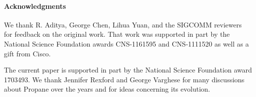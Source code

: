 \documentclass[10pt]{sigalternate052015}
\newcommand{\para}[1]{\paragraph*{\textbf{#1}}}
\begin{document}
\para{Acknowledgments}
We thank R. Aditya, George Chen,  Lihua Yuan, and the SIGCOMM reviewers for feedback on the original
work. That work was supported in part by the National Science
Foundation awards CNS-1161595 and CNS-1111520 as well as a gift from
Cisco.

The current paper is supported in part by the National Science
Foundation award 1703493.  We thank Jennifer Rexford and George Varghese for
many discussions about Propane over the years and for ideas concerning its evolution.


\balance




\end{document}

